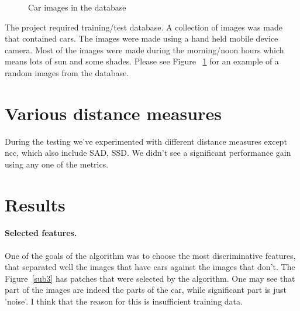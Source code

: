 \documentclass[12pt]{article}
\begin{document}
\begin{figure} \centering
	\caption{Car images in the database}
	\label{fig:sub1}
\end{figure}

The project required training/test database.  A collection of images was made that contained cars.  The images were made using a hand held mobile device camera.  Most of the images were made during the morning/noon hours which means lots of sun and some shades. Please see Figure ~\ref{fig:sub1} for  an example of a random images from the database.

\section{Various distance measures}

During the testing we've experimented with different distance measures except ncc, which also include SAD, SSD.  We didn't see a significant performance gain using any one of the metrics.

\section{Results}

\paragraph{Selected features.}  One of the goals of the algorithm was to choose the most discriminative features, that separated well the images that have cars against the images that don't.  The Figure~\ref{sub3} has patches that were selected by the algorithm.  One may see that part of the images are indeed the parts of the car, while significant part is just 'noise'.  I think that the reason for this is insufficient training data.
\end{document}
